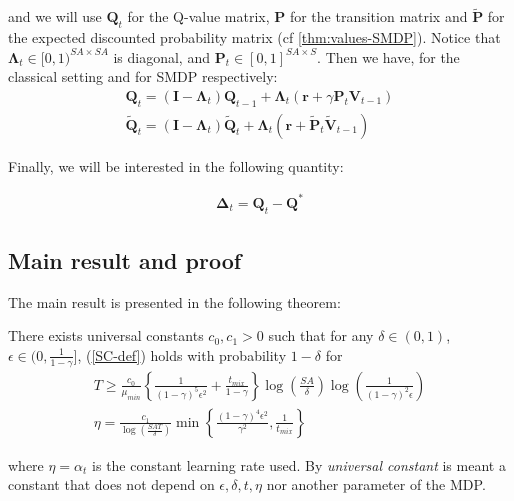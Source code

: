 and we will use $\mathbf{Q}_t$ for the Q-value matrix, $\mathbf{P}$ for the transition matrix and $\tilde{\mathbf{P}}$ for the expected discounted probability matrix (cf \ref{thm:values-SMDP}). Notice that $\mathbf{\Lambda}_t \in [0,1)^{SA \times SA}$ is diagonal, and $\mathbf{P}_t \in [0,1]^{SA \times S}$. Then we have, for the classical setting and for SMDP respectively:
\begin{align}
  \mathbf{Q}_t = (\mathbf{I} - \mathbf{\Lambda}_t)\mathbf{Q}_{t-1} + \mathbf{\Lambda}_t (\mathbf{r} + \gamma \mathbf{P}_t \mathbf{V}_{t-1})\label{eq:QL-update}\\
  \tilde{\mathbf{Q}}_t = (\mathbf{I} - \mathbf{\Lambda}_t)\tilde{\mathbf{Q}}_t + \mathbf{\Lambda}_t (\mathbf{r} + \tilde{\mathbf{P}}_t \tilde{\mathbf{V}}_{t-1})\label{eq:SQL-update}
\end{align}

Finally, we will be interested in the following quantity:

\begin{align}
  \mathbf{\Delta}_t = \mathbf{Q}_t - \mathbf{Q}^*\label{eq:Delta}
\end{align}


\subsection{Main result and proof}
\label{subsec:thm1}

The main result is presented in the following theorem:

\begin{thm}\label{thm:1}
  There exists universal constants $c_0, c_1 > 0$ such that for any $\delta \in (0,1)$, $\epsilon \in (0, \frac{1}{1 - \gamma}]$, (\ref{SC-def}) holds with probability $1 - \delta$ for
    \begin{align}
      T \geq \frac{c_0}{\mu_{min}} \left\{ \frac{1}{(1 - \gamma)^5\epsilon^2} + \frac{t_{mix}}{1 - \gamma} \right\}\log\left(\frac{SA}{\delta}\right)\log\left(\frac{1}{(1-\gamma)^2 \epsilon}\right)\label{eq:T}\\
      \eta = \frac{c_1}{\log(\frac{SAT}{\delta})} \min \left\{ \frac{(1-\gamma)^4 \epsilon^2}{\gamma^2}, \frac{1}{t_{mix}} \right\}\label{eq:eta}
    \end{align}
\end{thm}
where $\eta = \alpha_t$ is the constant learning rate used. By \emph{universal constant} is meant a constant that does not depend on $\epsilon, \delta, t, \eta$ nor another parameter of the MDP.

